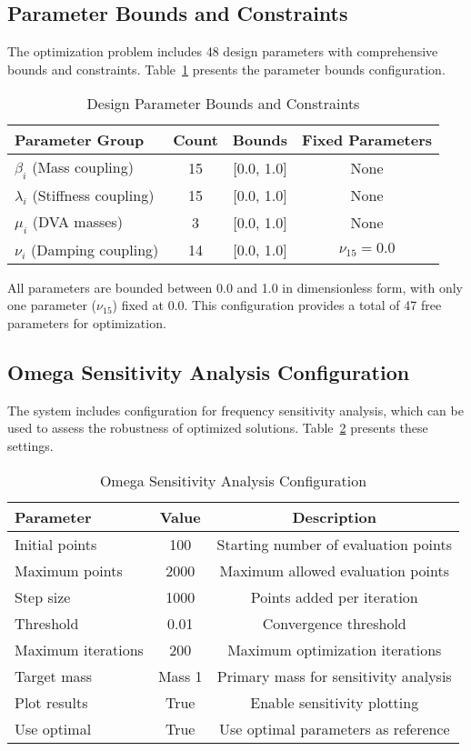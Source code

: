 \documentclass[12pt,a4paper]{article}
\begin{document}
\subsection{Parameter Bounds and Constraints}

The optimization problem includes 48 design parameters with comprehensive bounds and constraints. Table~\ref{Tab:parameter_bounds} presents the parameter bounds configuration.

\begin{table}[h!]
\centering
\caption{Design Parameter Bounds and Constraints}
\label{Tab:parameter_bounds}
\begin{tabular}{lccc}
\toprule
\textbf{Parameter Group} & \textbf{Count} & \textbf{Bounds} & \textbf{Fixed Parameters} \\
\midrule
$\beta_i$ (Mass coupling) & 15 & [0.0, 1.0] & None \\
$\lambda_i$ (Stiffness coupling) & 15 & [0.0, 1.0] & None \\
$\mu_i$ (DVA masses) & 3 & [0.0, 1.0] & None \\
$\nu_i$ (Damping coupling) & 14 & [0.0, 1.0] & $\nu_{15} = 0.0$ \\
\bottomrule
\end{tabular}
\end{table}

All parameters are bounded between 0.0 and 1.0 in dimensionless form, with only one parameter ($\nu_{15}$) fixed at 0.0. This configuration provides a total of 47 free parameters for optimization.

\subsection{Omega Sensitivity Analysis Configuration}

The system includes configuration for frequency sensitivity analysis, which can be used to assess the robustness of optimized solutions. Table~\ref{Tab:omega_sensitivity} presents these settings.

\begin{table}[h!]
\centering
\caption{Omega Sensitivity Analysis Configuration}
\label{Tab:omega_sensitivity}
\begin{tabular}{lcc}
\toprule
\textbf{Parameter} & \textbf{Value} & \textbf{Description} \\
\midrule
Initial points & 100 & Starting number of evaluation points \\
Maximum points & 2000 & Maximum allowed evaluation points \\
Step size & 1000 & Points added per iteration \\
Threshold & 0.01 & Convergence threshold \\
Maximum iterations & 200 & Maximum optimization iterations \\
Target mass & Mass 1 & Primary mass for sensitivity analysis \\
Plot results & True & Enable sensitivity plotting \\
Use optimal & True & Use optimal parameters as reference \\
\bottomrule
\end{tabular}
\end{table}
\end{document}
